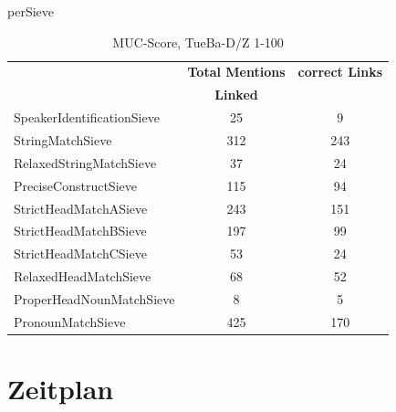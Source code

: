 \documentclass[11pt,a4paper]{beamer}
\begin{document}
\begin{frame}{perSieve}
\begin{table}[h]
\begin{tabular}{lcc}
                           & \textbf{Total Mentions} & \textbf{correct Links} \\
                          &\textbf{Linked}			&\\
SpeakerIdentificationSieve & 25                             & 9                      \\
StringMatchSieve           & 312                            & 243   					\\
RelaxedStringMatchSieve    & 37                             & 24                     \\
PreciseConstructSieve      & 115                            & 94                     \\
StrictHeadMatchASieve      & 243                            & 151                    \\
StrictHeadMatchBSieve      & 197                            & 99                     \\
StrictHeadMatchCSieve      & 53                             & 24                     \\
RelaxedHeadMatchSieve      & 68                             & 52                     \\
ProperHeadNounMatchSieve   & 8                              & 5                      \\
PronounMatchSieve          & 425                            & 170                    \\
\end{tabular}
\caption{MUC-Score, TueBa-D/Z 1-100}
\end{table}
\end{frame}



  

\section{Zeitplan}
\end{document}
